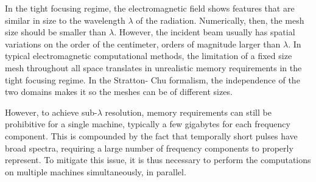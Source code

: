 \documentclass[11pt,SymmetricalJury]{inrsthesis/inrsthesis}
\begin{document}


In the tight focusing regime, the electromagnetic field shows features that are
similar in size to the wavelength $\lambda$ of the radiation. Numerically, then,
the mesh size should be smaller than $\lambda$. However, the incident beam
usually has spatial variations on the order of the centimeter, orders of
magnitude larger than $\lambda$. In typical electromagnetic computational
methods, the limitation of a fixed size mesh throughout all space translates in
unrealistic memory requirements in the tight focusing regime. In the Stratton-
Chu formalism, the independence of the two domains makes it so the meshes can be
of different sizes.

However, to achieve sub-$\lambda$ resolution, memory requirements can still be
prohibitive for a single machine, typically a few gigabytes for each frequency
component. This is compounded by the fact that temporally short pulses have
broad spectra, requiring a large number of frequency components to properly
represent. To mitigate this issue, it is thus necessary to perform the
computations on multiple machines simultaneously, in parallel.
\end{document}
